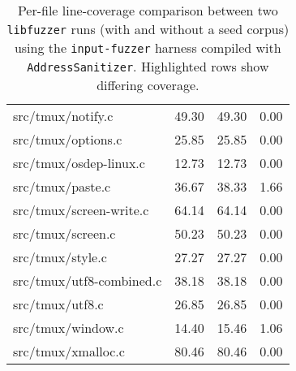 \documentclass[11pt,a4paper,twocolumn]{article}
\begin{document}
\begin{table*}[!tb]
\begin{tabular}{@{}lrrr@{}}
		src/tmux/notify.c                   & 49.30 & 49.30 & 0.00 \\
		src/tmux/options.c                  & 25.85 & 25.85 & 0.00 \\
		src/tmux/osdep-linux.c              & 12.73 & 12.73 & 0.00 \\
		\rowcolor{yellow} src/tmux/paste.c  & 36.67 & 38.33 & 1.66 \\
		src/tmux/screen-write.c             & 64.14 & 64.14 & 0.00 \\
		src/tmux/screen.c                   & 50.23 & 50.23 & 0.00 \\
		src/tmux/style.c                    & 27.27 & 27.27 & 0.00 \\
		src/tmux/utf8-combined.c            & 38.18 & 38.18 & 0.00 \\
		src/tmux/utf8.c                     & 26.85 & 26.85 & 0.00 \\
		\rowcolor{yellow} src/tmux/window.c & 14.40 & 15.46 & 1.06 \\
		src/tmux/xmalloc.c                  & 80.46 & 80.46 & 0.00 \\
		\bottomrule
	\end{tabular}

	\caption{Per-file line-coverage comparison between two \texttt{libfuzzer} runs (with and without a seed corpus) using the \texttt{input-fuzzer} harness compiled with \texttt{AddressSanitizer}.  Highlighted rows show differing coverage.}
	\label{tbl:coverage-comparison}
\end{table*}
\end{document}
